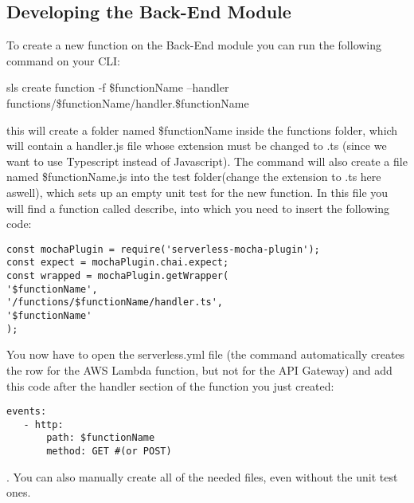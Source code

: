 \subsection{Developing the Back-End Module}
To create a new function on the Back-End module you can run the following command on your CLI: 
\begin{center}
sls create function -f \$functionName --handler functions/\$functionName/handler.\$functionName
\end{center}
this will create a folder named \$functionName inside the functions folder, which will contain a handler.js file whose extension must be changed to .ts (since we want to use Typescript instead of Javascript). 
The command will also create a file named \$functionName.js into the test folder(change the extension to .ts here aswell), which sets up an empty unit test for the new function.
In this file you will find a function called describe, into which you need to insert the following code:
\begin{lstlisting}
const mochaPlugin = require('serverless-mocha-plugin');
const expect = mochaPlugin.chai.expect;
const wrapped = mochaPlugin.getWrapper(
'$functionName', 
'/functions/$functionName/handler.ts',
'$functionName'
);
\end{lstlisting}
You now have to open the serverless.yml file (the command automatically creates the row for the AWS Lambda function, but not for the API Gateway) and add this code after the handler section of the function you just created:
\begin{lstlisting}
events:
   - http:
       path: $functionName
       method: GET #(or POST)
\end{lstlisting}.
You can also manually create all of the needed files, even without the unit test ones.